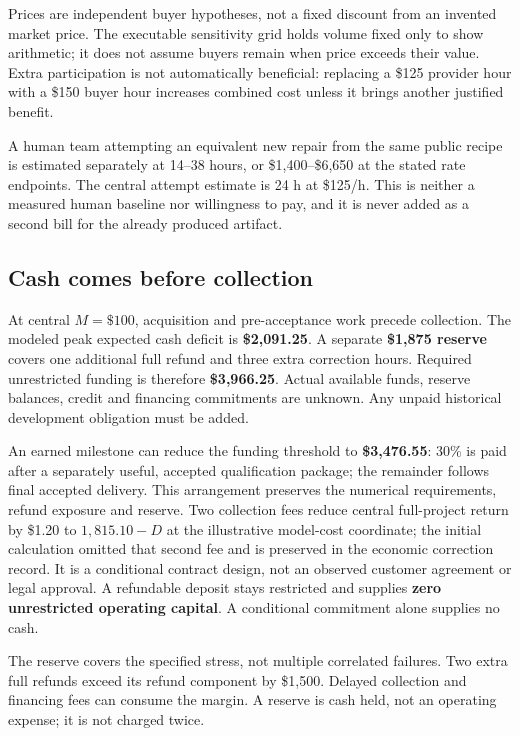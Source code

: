 \documentclass[
  10pt,
]{article}
\begin{document}
Prices are independent buyer hypotheses, not a fixed discount from an
invented market price. The executable sensitivity grid holds volume
fixed only to show arithmetic; it does not assume buyers remain when
price exceeds their value. Extra participation is not automatically
beneficial: replacing a \$125 provider hour with a \$150 buyer hour
increases combined cost unless it brings another justified benefit.

A human team attempting an equivalent new repair from the same public
recipe is estimated separately at 14--38 hours, or \$1,400--\$6,650 at
the stated rate endpoints. The central attempt estimate is 24 h at
\$125/h. This is neither a measured human baseline nor willingness to
pay, and it is never added as a second bill for the already produced
artifact.

\hypertarget{cash-comes-before-collection}{%
\subsection{Cash comes before
collection}\label{cash-comes-before-collection}}

At central \(M=\$100\), acquisition and pre-acceptance work precede
collection. The modeled peak expected cash deficit is
\textbf{\$2,091.25}. A separate \textbf{\$1,875 reserve} covers one
additional full refund and three extra correction hours. Required
unrestricted funding is therefore \textbf{\$3,966.25}. Actual available
funds, reserve balances, credit and financing commitments are unknown.
Any unpaid historical development obligation must be added.

An earned milestone can reduce the funding threshold to
\textbf{\$3,476.55}: 30\% is paid after a separately useful, accepted
qualification package; the remainder follows final accepted delivery.
This arrangement preserves the numerical requirements, refund exposure
and reserve. Two collection fees reduce central full-project return by
\$1.20 to \(1,815.10-D\) at the illustrative model-cost coordinate; the
initial calculation omitted that second fee and is preserved in the
economic correction record. It is a conditional contract design, not an
observed customer agreement or legal approval. A refundable deposit
stays restricted and supplies \textbf{zero unrestricted operating
capital}. A conditional commitment alone supplies no cash.

The reserve covers the specified stress, not multiple correlated
failures. Two extra full refunds exceed its refund component by \$1,500.
Delayed collection and financing fees can consume the margin. A reserve
is cash held, not an operating expense; it is not charged twice.
\end{document}
